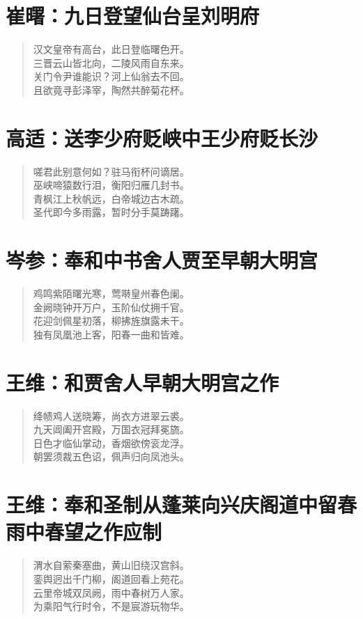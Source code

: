\documentclass[12pt,oneside]{book}
\newenvironment{shici}{%
\begin{verse}\centering\yanti\large\hspace{12pt}}{\end{verse}}
\begin{document}
\begin{common-format}
\chapter{崔曙：九日登望仙台呈刘明府}
\begin{shici}
汉文皇帝有高台，此日登临曙色开。\\
三晋云山皆北向，二陵风雨自东来。\\
关门令尹谁能识？河上仙翁去不回。\\
且欲竟寻彭泽宰，陶然共醉菊花杯。
\end{shici}

\chapter{高适：送李少府贬峡中王少府贬长沙}
\begin{shici}
嗟君此别意何如？驻马衔杯问谪居。\\
巫峡啼猿数行泪，衡阳归雁几封书。\\
青枫江上秋帆远，白帝城边古木疏。\\
圣代即今多雨露，暂时分手莫踌躇。
\end{shici}

\chapter{岑参：奉和中书舍人贾至早朝大明宫}
\begin{shici}
鸡鸣紫陌曙光寒，莺啭皇州春色阑。\\
金阙晓钟开万户，玉阶仙仗拥千官。\\
花迎剑佩星初落，柳拂旌旗露未干。\\
独有凤凰池上客，阳春一曲和皆难。
\end{shici}

\chapter{王维：和贾舍人早朝大明宫之作}
\begin{shici}
绛帻鸡人送晓筹，尚衣方进翠云裘。\\
九天阊阖开宫殿，万国衣冠拜冕旒。\\
日色才临仙掌动，香烟欲傍衮龙浮。\\
朝罢须裁五色诏，佩声归向凤池头。
\end{shici}

\chapter{王维：奉和圣制从蓬莱向兴庆阁道中留春雨中春望之作应制}
\begin{shici}
渭水自萦秦塞曲，黄山旧绕汉宫斜。\\
銮舆迥出千门柳，阁道回看上苑花。\\
云里帝城双凤阙，雨中春树万人家。\\
为乘阳气行时令，不是宸游玩物华。
\end{shici}


\end{common-format}
\end{document}
